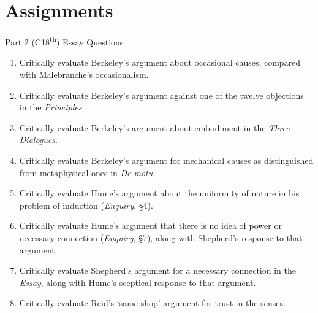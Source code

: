 \documentclass[10pt,letterpaper]{beamer}
\begin{document}
\section[Assignments]{Assignments}
\label{final}
\begin{frame}{Part 2 (C18\textsuperscript{th}) Essay Questions}%
\begin{enumerate}\small %
    \item Critically evaluate Berkeley’s argument about occasional causes, compared with Malebranche’s occasionalism.
    \item Critically evaluate Berkeley’s argument against one of the twelve objections in the \textit{Principles}. 
    \item Critically evaluate Berkeley’s argument about embodiment in the \textit{Three Dialogues}.
    \item Critically evaluate Berkeley’s argument for mechanical causes as distinguished from metaphysical ones in \textit{De motu}. %
    \item Critically evaluate Hume’s argument about the uniformity of nature in his problem of induction (\textit{Enquiry}, §4).
    \item Critically evaluate Hume’s argument that there is no idea of power or necessary connection (\textit{Enquiry}, §7), along with Shepherd’s response to that argument.
    \item Critically evaluate Shepherd’s argument for a necessary connection in the \textit{Essay}, along with Hume’s sceptical response to that argument.
    \item Critically evaluate Reid’s ‘same shop’ argument for trust in the senses.
\end{enumerate}
\end{frame}
\end{document}
